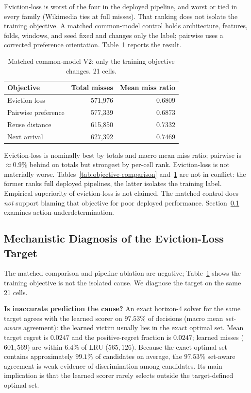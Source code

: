 \documentclass[preprint,12pt]{elsarticle}
\begin{document}
Eviction-loss is worst of the four in the deployed pipeline, and worst or tied in every family (Wikimedia ties at full misses). That ranking does not isolate the training objective. A matched common-model control holds architecture, features, folds, windows, and seed fixed and changes only the label; pairwise uses a corrected preference orientation. Table~\ref{tab:common-model-v2} reports the result.

\begin{table}[!htbp]
\centering
\caption{Matched common-model V2: only the training objective changes. 21 cells.}
\label{tab:common-model-v2}
\small
\renewcommand{\arraystretch}{1.15}
\begin{tabular}{l r r}
\toprule
Objective & Total misses & Mean miss ratio \\
\midrule
Eviction loss             & 571{,}976 & 0.6809 \\
Pairwise preference       & 577{,}339 & 0.6873 \\
Reuse distance            & 615{,}850 & 0.7332 \\
Next arrival              & 627{,}392 & 0.7469 \\
\bottomrule
\end{tabular}
\end{table}

Eviction-loss is nominally best by totals and macro mean miss ratio; pairwise is $\approx 0.9\%$ behind on totals but strongest by per-cell rank. Eviction-loss is not materially worse. Tables~\ref{tab:objective-comparison} and~\ref{tab:common-model-v2} are not in conflict: the former ranks full deployed pipelines, the latter isolates the training label. Empirical superiority of eviction-loss is not claimed. The matched control does \emph{not} support blaming that objective for poor deployed performance. Section~\ref{subsec:mechanistic_diagnosis} examines action-underdetermination.

\subsection{Mechanistic Diagnosis of the Eviction-Loss Target}
\label{subsec:mechanistic_diagnosis}

The matched comparison and pipeline ablation are negative; Table~\ref{tab:common-model-v2} shows the training objective is not the isolated cause. We diagnose the target on the same 21 cells.

\textbf{Is inaccurate prediction the cause?} An exact horizon-4 solver for the same target agrees with the learned scorer on $97.53\%$ of decisions (macro mean \emph{set-aware} agreement): the learned victim usually lies in the exact optimal set. Mean target regret is $0.0247$ and the positive-regret fraction is $0.0247$; learned misses ($601{,}569$) are within $6.4\%$ of LRU ($565{,}126$). Because the exact optimal set contains approximately $99.1\%$ of candidates on average, the $97.53\%$ set-aware agreement is weak evidence of discrimination among candidates. Its main implication is that the learned scorer rarely selects outside the target-defined optimal set.
\end{document}
